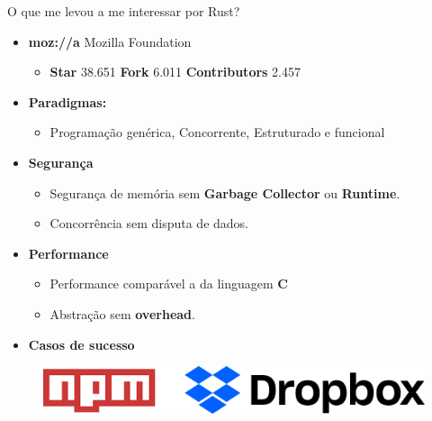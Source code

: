 \begin{frame}[fragile]{O que me levou a me interessar por Rust?}
\begin{center}
\begin{itemize}
    \item \textbf{moz://a} Mozilla Foundation
    \begin{itemize}
        \item \textbf{Star} 38.651  \textbf{Fork} 6.011 \textbf{Contributors} 2.457
    \end{itemize}{}
    \item \textbf{Paradigmas:}
    \begin{itemize}
        \item Programação genérica, Concorrente, Estruturado e funcional
    \end{itemize}{}
    \item \textbf{Segurança}
    \begin{itemize}
        \item Segurança de memória sem \textbf{Garbage Collector} ou \textbf{Runtime}.
        \item Concorrência sem disputa de dados.
    \end{itemize}
    \item \textbf{Performance}
    \begin{itemize}
        \item Performance comparável a da linguagem \textbf{C}
        \item Abstração sem \textbf{overhead}.
    \end{itemize}{}
    \item \textbf{Casos de sucesso}
\end{itemize}
\end{center}
\begin{center}
    \begin{figure}[ht!]
  \centering
  \includegraphics[scale=0.6]{images/cases.png}
\end{figure}
\end{center}{}
\end{frame}

